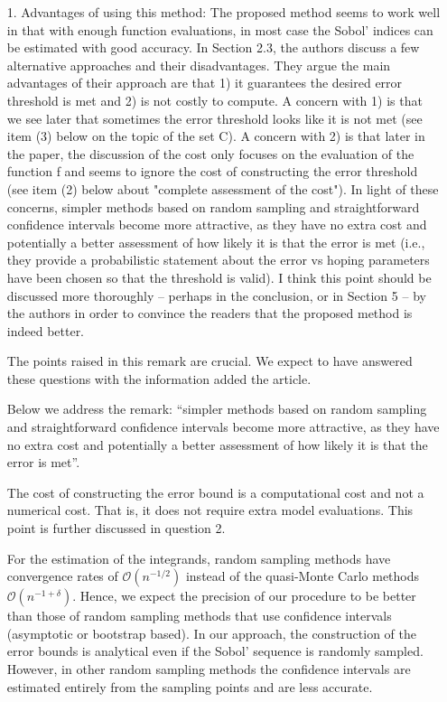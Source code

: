 \documentclass[10pt,a4paper]{article}
\begin{document}
\begin{itemize}
\item[1.] Advantages of using this method: The proposed method seems to work well in that with enough function evaluations, in most case the Sobol' indices can be estimated with good accuracy. In Section 2.3, the authors discuss a few alternative approaches and their disadvantages. They argue the main advantages of their approach are that 1) it guarantees the desired error threshold is met and 2) is not costly to compute. A concern with 1) is that we see later that sometimes the error threshold looks like it is not met (see item (3) below on the topic of the set C). A concern with 2) is that later in the paper, the discussion of the cost only focuses on the evaluation of the function f and seems to ignore the cost of constructing the error threshold (see item (2) below about "complete assessment of the cost"). In light of these concerns, simpler methods based on random sampling and straightforward confidence intervals become more attractive, as they have no extra cost and potentially a better assessment of how likely it is that the error is met (i.e., they provide a probabilistic statement about the error vs hoping parameters have been chosen so that the threshold is valid). I think this point should be discussed more thoroughly -- perhaps in the conclusion, or in Section 5 -- by the authors in order to convince the readers that the proposed method is indeed better.

{\color{blue} The points raised in this remark are crucial. We expect to have answered these questions with the information added the article.

Below we address the remark: ``simpler methods based on random sampling and straightforward confidence intervals become more attractive, as they have no extra cost and potentially a better assessment of how likely it is that the error is met''. 

The cost of constructing the error bound is a computational cost and not a numerical cost. That is, it does not require extra model evaluations. This point is further discussed in question 2.

For the estimation of the integrands, random sampling methods have convergence rates of $\mathcal{O}(n^{-1/2})$ instead of the quasi-Monte Carlo methods $\mathcal{O}(n^{-1+\delta})$. Hence, we expect the precision of our procedure to be better than those of random sampling methods that use confidence intervals (asymptotic or bootstrap based). In our approach, the construction of the error bounds is analytical even if the Sobol' sequence is randomly sampled. However, in other random sampling methods the confidence intervals are estimated entirely from the sampling points and are less accurate.

}
\end{itemize}
\end{document}

